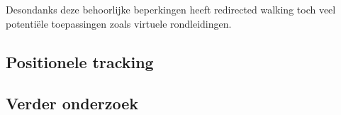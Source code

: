 \documentclass[a4paper,12pt]{article}
\begin{document}
Desondanks deze behoorlijke beperkingen heeft redirected walking toch veel
potenti\"ele toepassingen zoals virtuele rondleidingen.


\subsection{Positionele tracking}


\subsection{Verder onderzoek}


\newpage


\end{document}
